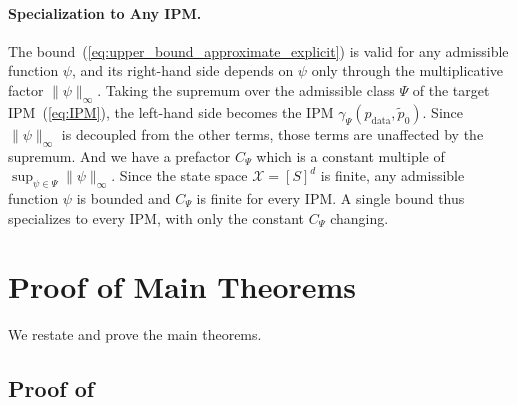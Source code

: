 \documentclass{article} %
\def\eqref#1{equation~\ref{#1}}
\renewcommand{\eqref}[1]{\textup{(\ref{#1})}}
\begin{document}
\paragraph{Specialization to Any IPM.} The bound~\eqref{eq:upper_bound_approximate_explicit} is valid for any admissible function $\psi$, and its right-hand side depends on $\psi$ only through the multiplicative factor $\| \psi \|_\infty$. Taking the supremum over the admissible class $\Psi$ of the target IPM~\eqref{eq:IPM}, the left-hand side becomes the IPM $\gamma_\Psi(p_{\mathrm{data}}, \tilde{p}_0)$. Since $\| \psi \|_\infty$ is decoupled from the other terms, those terms are unaffected by the supremum. And we have a prefactor $C_\Psi$ which is a constant multiple of $\sup_{\psi \in \Psi} \| \psi \|_\infty$. Since the state space $\mathcal{X} = [S]^d$ is finite, any admissible function $\psi$ is bounded and $C_\Psi$ is finite for every IPM. A single bound thus specializes to every IPM, with only the constant $C_\Psi$ changing.


\section{Proof of Main Theorems}\label{appendix:proof_main}
We restate and prove the main theorems.
\subsection{Proof of \texorpdfstring{}{Theorem \ref*{lem:IPM}}}\label{subsec:proofIPM}
\lemIPM*
\end{document}
